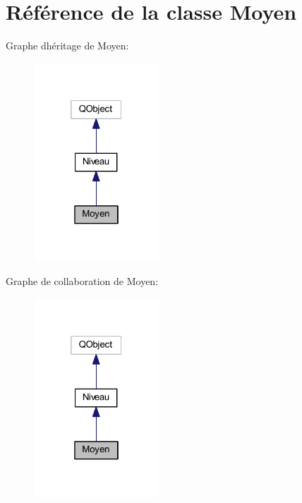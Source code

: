 \hypertarget{class_moyen}{}\section{Référence de la classe Moyen}
\label{class_moyen}


Graphe d\textquotesingle{}héritage de Moyen\+:
\nopagebreak
\begin{figure}[H]
\begin{center}
\leavevmode
\includegraphics[width=133pt]{class_moyen__inherit__graph}
\end{center}
\end{figure}


Graphe de collaboration de Moyen\+:
\nopagebreak
\begin{figure}[H]
\begin{center}
\leavevmode
\includegraphics[width=133pt]{class_moyen__coll__graph}
\end{center}
\end{figure}
